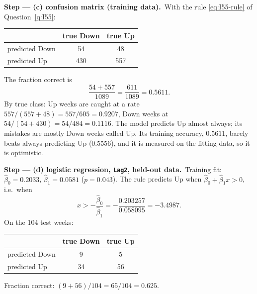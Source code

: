 \documentclass[11pt,a4paper]{article}
\numberwithin{equation}{questao}   %
\newcommand{\passo}[2]{\par\smallskip\noindent\textbf{Step --- #1.}~#2}
\begin{document}
\begin{sol}
\passo{(c) confusion matrix (training data)}{With the rule \eqref{eq:I55-rule} of Question~\ref{q:I55}:
\begin{center}\begin{tabular}{lcc}\toprule
 & true Down & true Up\\\midrule
predicted Down & 54 & 48\\
predicted Up & 430 & 557\\\bottomrule\end{tabular}\end{center}
The fraction correct is
\begin{equation}\label{eq:I413-acc}
\frac{54+557}{1089}=\frac{611}{1089}=0.5611 .
\end{equation}
By true class: Up weeks are caught at a rate $557/(557+48)=557/605=0.9207$, Down weeks at
$54/(54+430)=54/484=0.1116$. The model predicts Up almost always; its mistakes are mostly Down
weeks called Up. Its training accuracy, $0.5611$, barely beats always predicting Up ($0.5556$),
and it is measured on the fitting data, so it is optimistic.}

\passo{(d) logistic regression, \texttt{Lag2}, held-out data}{Training fit:
$\hat\beta_0=0.2033$, $\hat\beta_1=0.0581$ ($p=0.043$). The rule predicts Up when
$\hat\beta_0+\hat\beta_1x>0$, i.e.\ when
\begin{equation}\label{eq:I413-thr}
x>-\frac{\hat\beta_0}{\hat\beta_1}=-\frac{0.203257}{0.058095}=-3.4987 .
\end{equation}
On the 104 test weeks:
\begin{center}\begin{tabular}{lcc}\toprule
 & true Down & true Up\\\midrule
predicted Down & 9 & 5\\
predicted Up & 34 & 56\\\bottomrule\end{tabular}\end{center}
Fraction correct: $(9+56)/104=65/104=0.625$.}


\end{sol}
\end{document}
